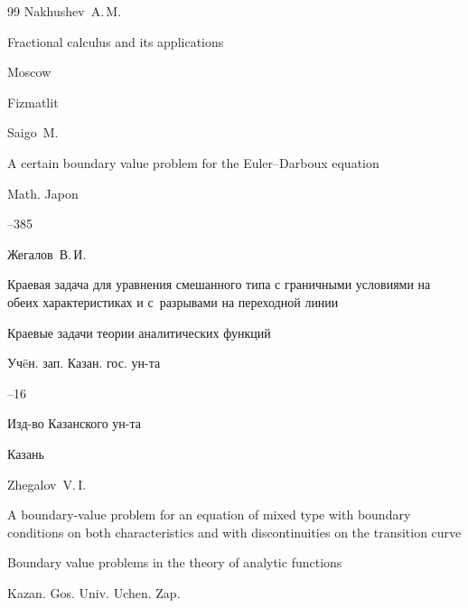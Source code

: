 \begin{thebibliography}{99}
\by Nakhushev~A.\,M.

\book Fractional calculus and its applications

\publaddr Moscow

\publ Fizmatlit






\by Saigo~M.

\paper A certain boundary value problem for the Euler--Darboux equation

\jour Math. Japon

--385











\by Жегалов~В.\,И.

\paper Краевая задача для уравнения смешанного типа с граничными условиями на обеих характеристиках и с~разрывами на переходной линии

\inbook Краевые задачи теории аналитических функций

\serial Уч\"eн. зап. Казан. гос. ун-та




--16

\publ Изд-во Казанского ун-та

\publaddr Казань




\misctransl

\by Zhegalov~V.\,I. 

\paper A boundary-value problem for an equation of mixed type with boundary conditions on both characteristics and with discontinuities on the transition curve

\inbook Boundary value problems in the theory of analytic functions

\serial Kazan. Gos. Univ. Uchen. Zap.


\end{thebibliography}
